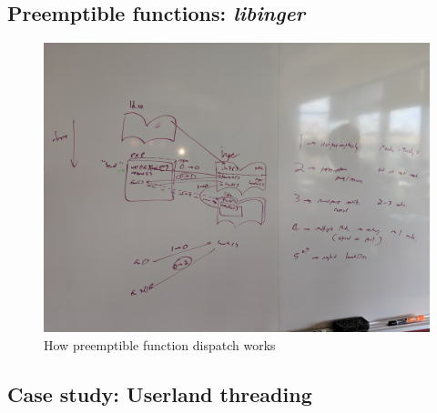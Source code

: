 \subsection{Preemptible functions: \textit{libinger}}
\label{sec:libinger}

\begin{figure}
\includegraphics[width=\columnwidth]{figs/calltree}
\caption{How preemptible function dispatch works}
\end{figure}

\subsection{Case study: Userland threading}
\label{sec:threading}


